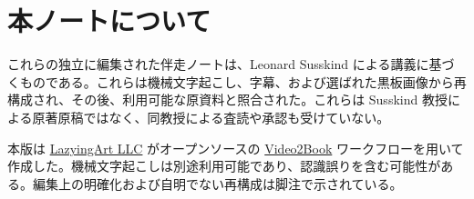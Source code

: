 \documentclass[11pt,oneside]{book}
\begin{document}
\frontmatter
\hypersetup{pageanchor=false}

\hypersetup{pageanchor=true}

\clearpage
\chapter*{本ノートについて}
これらの独立に編集された伴走ノートは、Leonard Susskind による講義に基づくものである。これらは機械文字起こし、字幕、および選ばれた黒板画像から再構成され、その後、利用可能な原資料と照合された。これらは Susskind 教授による原著原稿ではなく、同教授による査読や承認も受けていない。

本版は \href{https://lazying.art}{LazyingArt LLC} がオープンソースの \href{https://github.com/lachlanchen/Video2Book}{Video2Book} ワークフローを用いて作成した。機械文字起こしは別途利用可能であり、認識誤りを含む可能性がある。編集上の明確化および自明でない再構成は脚注で示されている。
\clearpage
\tableofcontents
\mainmatter










\end{document}
